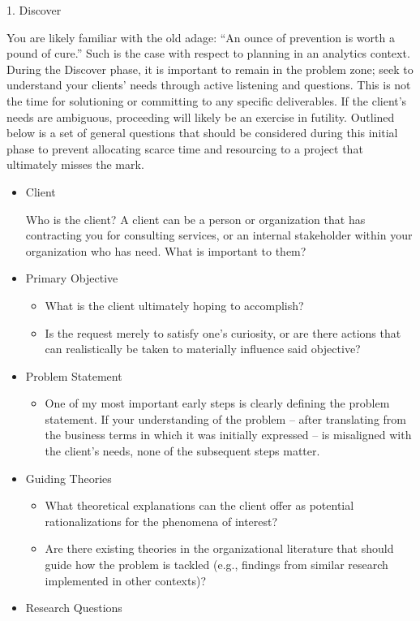 \documentclass[]{book}
\providecommand{\tightlist}{%
  \setlength{\itemsep}{0pt}\setlength{\parskip}{0pt}}
\begin{document}
1. Discover

You are likely familiar with the old adage: ``An ounce of prevention is worth a pound of cure.'' Such is the case with respect to planning in an analytics context. During the Discover phase, it is important to remain in the problem zone; seek to understand your clients' needs through active listening and questions. This is not the time for solutioning or committing to any specific deliverables. If the client's needs are ambiguous, proceeding will likely be an exercise in futility. Outlined below is a set of general questions that should be considered during this initial phase to prevent allocating scarce time and resourcing to a project that ultimately misses the mark.

\begin{itemize}
\item
  Client

  Who is the client? A client can be a person or organization that has contracting you for consulting services, or an internal stakeholder within your organization who has need. What is important to them?
\item
  Primary Objective

  \begin{itemize}
  \tightlist
  \item
    What is the client ultimately hoping to accomplish?
  \item
    Is the request merely to satisfy one's curiosity, or are there actions that can realistically be taken to materially influence said objective?
  \end{itemize}
\item
  Problem Statement

  \begin{itemize}
  \tightlist
  \item
    One of my most important early steps is clearly defining the problem statement. If your understanding of the problem -- after translating from the business terms in which it was initially expressed -- is misaligned with the client's needs, none of the subsequent steps matter.
  \end{itemize}
\item
  Guiding Theories

  \begin{itemize}
  \tightlist
  \item
    What theoretical explanations can the client offer as potential rationalizations for the phenomena of interest?
  \item
    Are there existing theories in the organizational literature that should guide how the problem is tackled (e.g., findings from similar research implemented in other contexts)?
  \end{itemize}
\item
  Research Questions


\end{itemize}
\end{document}
